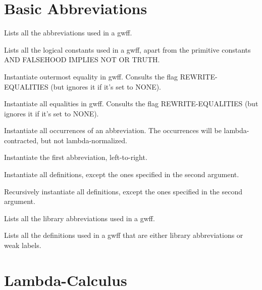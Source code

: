 \section{Basic Abbreviations}

\begin{description} 
\item[ABBR]  
Lists all the abbreviations used in a gwff.

\item[CONSTANTS]  
Lists all the logical constants used in a gwff, apart 
from the primitive constants AND FALSEHOOD IMPLIES NOT OR TRUTH.

\item[EXPAND=]  
Instantiate outermost equality in gwff. Consults the flag
  REWRITE-EQUALITIES (but ignores it if it's set to NONE).

\item[EXPAND=*]  
Instantiate all equalities in gwff. Consults the flag
  REWRITE-EQUALITIES (but ignores it if it's set to NONE).

\item[INST]  
Instantiate all occurrences of an abbreviation.
The occurrences will be lambda-contracted, but not lambda-normalized.

\item[INST1]  
Instantiate the first abbreviation, left-to-right.

\item[INSTALL]  
Instantiate all definitions, except the ones specified
in the second argument.

\item[INSTALL-REC]  
Recursively instantiate all definitions, except the ones specified
in the second argument.

\item[LIB-ABBR]  
Lists all the library abbreviations used in a gwff.

\item[NEW-DEFS]  
Lists all the definitions used in a gwff that are
either library abbreviations or weak labels.
\item
\end{description}

\section{Lambda-Calculus}

